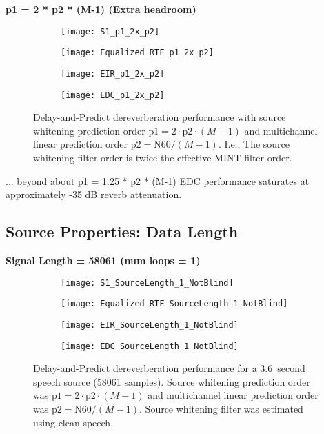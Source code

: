 \textbf{p1 = 2 * p2  * (M-1) (Extra headroom)}

\begin{figure}[H]
	\centering
	\begin{subfigure}[b]{0.49\textwidth}
		\centering
		\texttt{[image: S1\_p1\_2x\_p2]}
	\end{subfigure}
	\hfill
	\begin{subfigure}[b]{0.49\textwidth}
		\centering
		\texttt{[image: Equalized\_RTF\_p1\_2x\_p2]}
	\end{subfigure}
	\hfill
	\begin{subfigure}[b]{0.49\textwidth}
		\centering
		\texttt{[image: EIR\_p1\_2x\_p2]}
	\end{subfigure}
	\hfill
	\begin{subfigure}[b]{0.49\textwidth}
		\centering
		\texttt{[image: EDC\_p1\_2x\_p2]}
	\end{subfigure}
	\hfill
	\caption{Delay-and-Predict dereverberation performance with source whitening prediction order $\mathrm{p1} = 2 \cdot \mathrm{p2} \cdot (M-1)$ and multichannel linear prediction order $\mathrm{p2} = \mathrm{N60} / (M-1)$. I.e., The source whitening filter order is twice the effective MINT filter order.}
	\label{fig:params_p1_2x_p2}
\end{figure}

... beyond about p1 = 1.25 * p2 * (M-1) EDC performance saturates at approximately -35 dB reverb attenuation.

\subsection{Source Properties: Data Length}

\textbf{Signal Length = 58061 (num loops = 1)}

\begin{figure}[H]
	\centering
	\begin{subfigure}[b]{0.49\textwidth}
		\centering
		\texttt{[image: S1\_SourceLength\_1\_NotBlind]}
	\end{subfigure}
	\hfill
	\begin{subfigure}[b]{0.49\textwidth}
		\centering
		\texttt{[image: Equalized\_RTF\_SourceLength\_1\_NotBlind]}
	\end{subfigure}
	\hfill
	\begin{subfigure}[b]{0.49\textwidth}
		\centering
		\texttt{[image: EIR\_SourceLength\_1\_NotBlind]}
	\end{subfigure}
	\hfill
	\begin{subfigure}[b]{0.49\textwidth}
		\centering
		\texttt{[image: EDC\_SourceLength\_1\_NotBlind]}
	\end{subfigure}
	\hfill
	\caption{Delay-and-Predict dereverberation performance for a \qty{3.6}{second} speech source (58061 samples). Source whitening prediction order was $\mathrm{p1} = 2 \cdot \mathrm{p2} \cdot (M-1)$ and multichannel linear prediction order was $\mathrm{p2} = \mathrm{N60} / (M-1)$. Source whitening filter was estimated using clean speech.}
	\label{fig:params_source_length_1_not_blind}
\end{figure}

